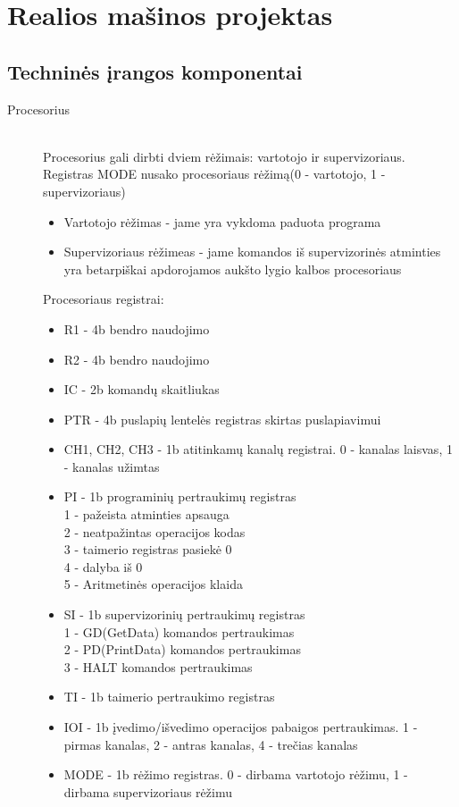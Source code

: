 \section{Realios mašinos projektas}

\subsection{Techninės įrangos komponentai}

\begin{description}
  \item[Procesorius]\leavevmode \\
Procesorius gali dirbti dviem rėžimais: vartotojo ir supervizoriaus. Registras MODE nusako procesoriaus rėžimą(0 - vartotojo, 1 - supervizoriaus)
\begin{itemize}
  \item Vartotojo rėžimas - jame yra vykdoma paduota programa
  \item Supervizoriaus rėžimeas - jame komandos iš supervizorinės atminties yra betarpiškai apdorojamos aukšto lygio kalbos procesoriaus
\end{itemize}
Procesoriaus registrai:
\begin{itemize}
  \item R1 - 4b bendro naudojimo
  \item R2 - 4b bendro naudojimo
  \item IC - 2b komandų skaitliukas
  \item PTR - 4b puslapių lentelės registras skirtas puslapiavimui
  \item CH1, CH2, CH3 - 1b atitinkamų kanalų registrai. 0 - kanalas laisvas, 1 - kanalas užimtas
  \item PI - 1b programinių pertraukimų registras\leavevmode
		\\1 - pažeista atminties apsauga
		\\2 - neatpažintas operacijos kodas
           	\\3 - taimerio registras pasiekė 0
		\\4 - dalyba iš 0
		\\5 - Aritmetinės operacijos klaida
  \item SI - 1b supervizorinių pertraukimų registras\leavevmode
		\\1 - GD(GetData) komandos pertraukimas
		\\2 - PD(PrintData) komandos pertraukimas
		\\3 - HALT komandos pertraukimas
  \item TI - 1b taimerio pertraukimo registras
  \item IOI - 1b įvedimo/išvedimo operacijos pabaigos pertraukimas. 1 - pirmas kanalas, 2 - antras kanalas, 4 - trečias kanalas
  \item MODE - 1b rėžimo registras. 0 - dirbama vartotojo rėžimu, 1 - dirbama supervizoriaus rėžimu
\end{itemize}


\end{description}
